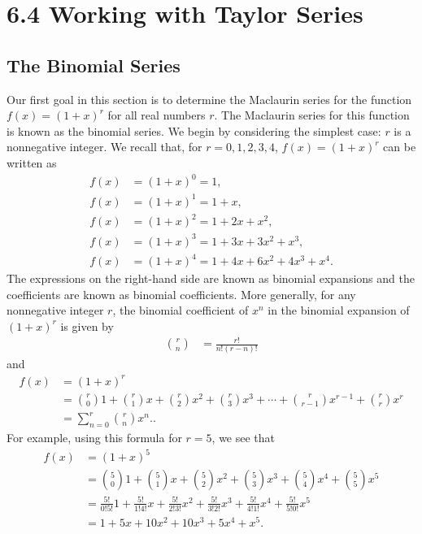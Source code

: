 \documentclass{report}
\begin{document}
    \pagebreak
    \section*{6.4 Working with Taylor Series}
    \bigbreak \noindent 

    \subsection*{The Binomial Series}
    \bigbreak \noindent 
    Our first goal in this section is to determine the Maclaurin series for the function \( f(x) = (1+x)^r \) for all real numbers \( r \). The Maclaurin series for this function is known as the binomial series. We begin by considering the simplest case: \( r \) is a nonnegative integer. We recall that, for \( r = 0, 1, 2, 3, 4 \), \( f(x) = (1+x)^r \) can be written as
    \begin{align*}
    f(x) &= (1+x)^0 = 1, \\
    f(x) &= (1+x)^1 = 1 + x, \\
    f(x) &= (1+x)^2 = 1 + 2x + x^2, \\
    f(x) &= (1+x)^3 = 1 + 3x + 3x^2 + x^3, \\
    f(x) &= (1+x)^4 = 1 + 4x + 6x^2 + 4x^3 + x^4.
    \end{align*}
    \bigbreak \noindent
    The expressions on the right-hand side are known as binomial expansions and the coefficients are known as binomial coefficients. More generally, for any nonnegative integer \( r \), the binomial coefficient of \( x^n \) in the binomial expansion of \( (1+x)^r \) is given by
    \bigbreak \noindent 
    \begin{align*}
    \binom{r}{n} &= \frac{r!}{n!(r-n)!} 
    \end{align*}
    and
    \begin{align*}
        f(x) &= (1+x)^r  \\
             &= \binom{r}{0}1 + \binom{r}{1}x + \binom{r}{2}x^2 + \binom{r}{3}x^3 + \cdots + \binom{r}{r-1}x^{r-1} + \binom{r}{r}x^r  \\
             &= \sum_{n=0} ^{r} \binom{r}{n}x^n. 
    .\end{align*}
    \bigbreak \noindent
    For example, using this formula for \( r=5 \), we see that
    \begin{align*}
    f(x) &= (1+x)^5 \\
    &= \binom{5}{0}1 + \binom{5}{1}x + \binom{5}{2}x^2 + \binom{5}{3}x^3 + \binom{5}{4}x^4 + \binom{5}{5}x^5 \\
    &= \frac{5!}{0!5!}1 + \frac{5!}{1!4!}x + \frac{5!}{2!3!}x^2 + \frac{5!}{3!2!}x^3 + \frac{5!}{4!1!}x^4 + \frac{5!}{5!0!}x^5 \\
    &= 1 + 5x + 10x^2 + 10x^3 + 5x^4 + x^5.
    \end{align*}
\end{document}
